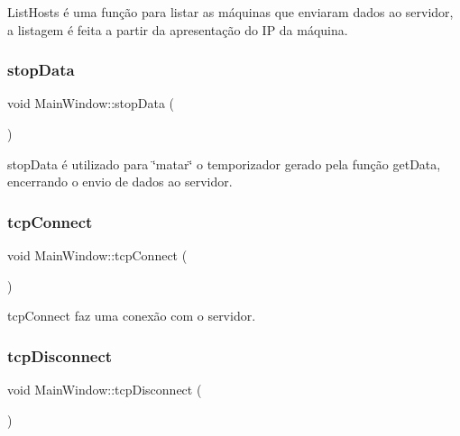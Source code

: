 List\+Hosts é uma função para listar as máquinas que enviaram dados ao servidor, a listagem é feita a partir da apresentação do IP da máquina. 

\mbox{\label{class_main_window_a79fdaf1fd769f0584f50da34e415b3de}} 
\subsubsection{\texorpdfstring{stop\+Data}{stopData}}
{\footnotesize\ttfamily void Main\+Window\+::stop\+Data (\begin{DoxyParamCaption}{ }\end{DoxyParamCaption})\hspace{0.3cm}{\ttfamily [slot]}}



stop\+Data é utilizado para \char`\"{}matar\char`\"{} o temporizador gerado pela função get\+Data, encerrando o envio de dados ao servidor. 

\mbox{\label{class_main_window_ac5b669957c442b6eb68573dacfce33e1}} 
\subsubsection{\texorpdfstring{tcp\+Connect}{tcpConnect}}
{\footnotesize\ttfamily void Main\+Window\+::tcp\+Connect (\begin{DoxyParamCaption}{ }\end{DoxyParamCaption})\hspace{0.3cm}{\ttfamily [slot]}}



tcp\+Connect faz uma conexão com o servidor. 

\mbox{\label{class_main_window_a4d22c4c7afc7ba0a2fa4c70515c85dda}} 
\subsubsection{\texorpdfstring{tcp\+Disconnect}{tcpDisconnect}}
{\footnotesize\ttfamily void Main\+Window\+::tcp\+Disconnect (\begin{DoxyParamCaption}{ }\end{DoxyParamCaption})\hspace{0.3cm}{\ttfamily [slot]}}



